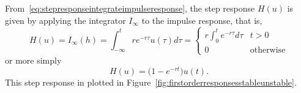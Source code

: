 From~\eqref{eq:stepresponseintegrateimpulseresponse}, the step response $H(u)$ is given by applying the integrator $I_\infty$ to the impulse response, that is, 
\[
H(u) = I_\infty(h) = \int_{-\infty}^t r e^{-r \tau} u(\tau) d\tau =  \begin{cases}
r \int_{0}^t e^{-r \tau} d\tau & t > 0 \\
0 & \text{otherwise} 
\end{cases}
\]
or more simply
\begin{equation}\label{eq:stepresponsefirstorder}
H(u) = \big( 1 - e^{-r t}\big) u(t).
\end{equation}
This step response in plotted in Figure~\ref{fig:firstorderresponsesstableunstable}.




